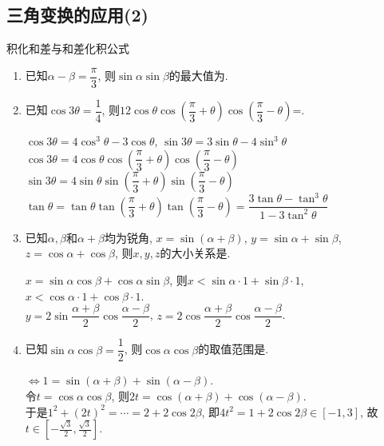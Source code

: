 \subsection{三角变换的应用(2)}
\zsd 积化和差与和差化积公式

\begin{enumerate}
\item 已知$\alpha-\beta=\dfrac{\pi}{3}$, 则$\sin\alpha\sin\beta$的最大值为. 

\item 已知$\cos3\theta=\dfrac{1}{4}$, 则$12\cos\theta\cos\left(\dfrac{\pi}{3}+\theta\right)\cos\left(\dfrac{\pi}{3}-\theta\right)$=. 
\begin{jieda}
$\cos3\theta=4\cos^3\theta-3\cos\theta$, $\sin3\theta=3\sin\theta-4\sin^3\theta$\\
$\cos3\theta=4\cos\theta\cos\left(\dfrac{\pi}{3}+\theta\right)\cos\left(\dfrac{\pi}{3}-\theta\right)$\\
$\sin3\theta=4\sin\theta\sin\left(\dfrac{\pi}{3}+\theta\right)\sin\left(\dfrac{\pi}{3}-\theta\right)$\\
$\tan\theta=\tan\theta\tan\left(\dfrac{\pi}{3}+\theta\right)\tan\left(\dfrac{\pi}{3}-\theta\right)=\dfrac{3\tan\theta-\tan^3\theta}{1-3\tan^2\theta}$
\end{jieda}

\item 已知$\alpha,\beta$和$\alpha+\beta$均为锐角, $x=\sin(\alpha+\beta)$, $y=\sin\alpha+\sin\beta$, $z=\cos\alpha+\cos\beta$, 
则$x,y,z$的大小关系是. 
\begin{jieda}
$x=\sin\alpha\cos\beta+\cos\alpha\sin\beta$, 则$x<\sin\alpha\cdot 1+\sin\beta\cdot 1$, $x<\cos\alpha\cdot 1+\cos\beta\cdot 1$. \\
$y=2\sin\dfrac{\alpha+\beta}{2}\cos\dfrac{\alpha-\beta}{2}$, $z=2\cos\dfrac{\alpha+\beta}{2}\cos\dfrac{\alpha-\beta}{2}$. 
\end{jieda}


\item 已知$\sin\alpha\cos\beta=\dfrac{1}{2}$, 则$\cos\alpha\cos\beta$的取值范围是. 
\begin{jieda}
$\iff 1=\sin(\alpha+\beta)+\sin(\alpha-\beta)$. \\
令$t=\cos\alpha\cos\beta$, 则$2t=\cos(\alpha+\beta)+\cos(\alpha-\beta)$. \\
于是$1^2+(2t)^2=\cdots=2+2\cos2\beta$, 即$4t^2=1+2\cos2\beta\in[-1,3]$, 故$t\in[-\frac{\sqrt{3}}{2},\frac{\sqrt{3}}{2}]$. 
\end{jieda}


\end{enumerate}
